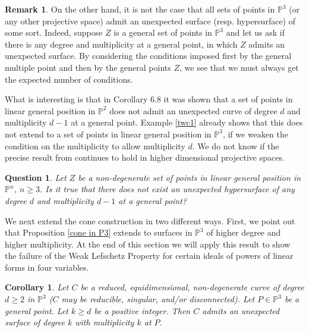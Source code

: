 \documentclass[12pt]{amsart}
\numberwithin{equation}{section}
\newtheorem{corollary}[theorem]{Corollary}
\newtheorem{question}[theorem]{Question}
\theoremstyle{definition}
\newtheorem{remark}[theorem]{Remark}
\newcommand{\PP}{ \ensuremath{\mathbb{P}}}
\begin{document}
\begin{remark} \label{no unexp for genl pts}
On the other hand, it is not the case that all sets of points in $\PP^3$ (or any other projective space) admit an 
unexpected surface (resp. hypersurface) of some sort. Indeed, suppose $Z$ is a general set of points in $\PP^3$ and let us 
ask if there is any degree and multiplicity at a general point, in which $Z$ admits an unexpected surface. By considering the 
conditions imposed first by the general multiple point and then by the general points $Z$, we see that we must always get the expected number of conditions.

What is interesting is that in \cite{CHMN} Corollary 6.8 it was shown that a set of points in linear general position in $\PP^2$ does not 
admit an unexpected curve of degree $d$ and multiplicity $d-1$ at a general point. Example \ref{twc1} already shows that this does not 
extend to a set of points in linear general position in $\PP^3$, if we weaken the condition on the multiplicity to allow multiplicity $d$. We do 
not know if the precise result from \cite{CHMN} continues to hold in higher dimensional projective spaces.
\end{remark}

\begin{question} \label{GLPQ}
Let $Z$ be a non-degenerate set of points in linear general position in $\PP^n$, $n \geq 3$. Is it true that there does not 
exist an unexpected hypersurface of any degree $d$ and multiplicity $d-1$ at a general point?
\end{question}


We next extend the cone construction  in two different ways. First, we point out that Proposition \ref{cone in P3} extends to surfaces in $\PP^3$ of higher degree and higher multiplicity. 
At the end of this section we will apply this result to show the failure of the Weak Lefschetz Property for certain ideals of powers of linear forms in four variables.

\begin{corollary} \label{higher deg}
Let $C$ be a reduced, equidimensional, non-degenerate curve of degree $d \geq 2$ in $\PP^3$ ($C$ may be reducible, singular, and/or disconnected). 
Let $P \in \PP^3$ be a general point. 
Let $k \geq d$ be a positive integer. Then $C$ admits an unexpected surface of degree $k$ with multiplicity $k$ at $P$.
\end{corollary}
\end{document}
